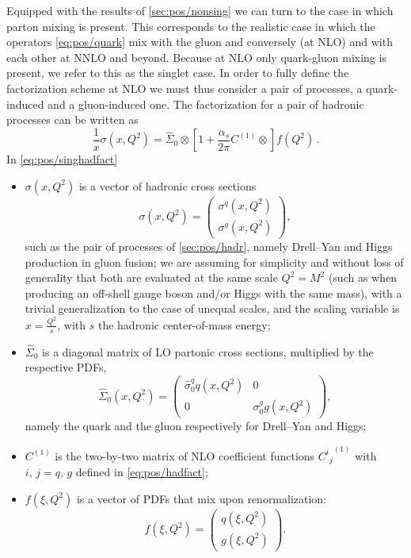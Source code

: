 Equipped with the results of \cref{sec:pos/nonsing} we can  turn to
the case in which parton mixing is present.   This corresponds to the
realistic case in which the operators \cref{eq:pos/quark} mix with
the gluon and conversely (at NLO) and with each other at NNLO and
beyond. Because at NLO only quark-gluon mixing is present, we refer to
this as the singlet case.
In order to fully define
the factorization scheme at NLO we must thus consider a pair of
processes, a quark-induced and a gluon-induced one.
The factorization for a pair of hadronic processes
can be written as 
\begin{equation}\label{eq:pos/singhadfact}
 \frac{1}{x} \sigma(x,Q^2)= \hat \Sigma_0\otimes \left[1
 +\frac{\alpha_s}{2\pi}  C^{(1)} \otimes \right] f(Q^2) \,.
 \end{equation}
In \cref{eq:pos/singhadfact} \begin{itemize}
  \item $\sigma(x,Q^2)$ is a vector of hadronic cross sections
\begin{equation}\label{eq:pos/hadxsec}
   \sigma(x,Q^2)=\left(\begin{array}{c} \sigma^{q}(x,Q^2)\\ \sigma^{g} (x,Q^2)\end{array}\right),
\end{equation}
 such as
the pair of processes of \cref{sec:pos/hadr}, namely Drell--Yan  and
Higgs production in gluon fusion; we are assuming for simplicity  and without loss of
generality that both are evaluated at the same scale $Q^2=M^2$ (such
as when producing an off-shell gauge boson and/or Higgs with the same
mass), with a trivial generalization to the case of unequal scales,
and the scaling variable is $x=\frac{Q^2}{s}$, with $s$ the hadronic
center-of-mass energy;
\item $\hat \Sigma_0$ is a diagonal matrix of LO partonic cross sections,
  multiplied by the respective PDFs, 
\begin{equation}\label{eq:pos/lohadxsec}
   \hat \Sigma_0(x,Q^2)=\left(\begin{array}{cc} \hat \sigma_0^{q} q (x,Q^2) &
   0 \\0 & \sigma_0^{g} g (x,Q^2) \end{array}\right),
\end{equation}
namely the quark and the gluon respectively for Drell--Yan and Higgs;
\item $C^{(1)}$ is the two-by-two matrix of NLO 
  coefficient functions ${C^i{}_{j}}^{(1)}$ with $i,\, j=q,\, g$
  defined in \cref{eq:pos/hadfact};
\item $f(\xi,Q^2)$ is a vector of PDFs that mix upon renormalization:
\begin{equation}\label{eq:pos/singpdf}
   f(\xi,Q^2)=\left(\begin{array}{c} q(\xi,Q^2) \\ g(\xi,Q^2) \end{array}\right).
\end{equation}
\end{itemize}

